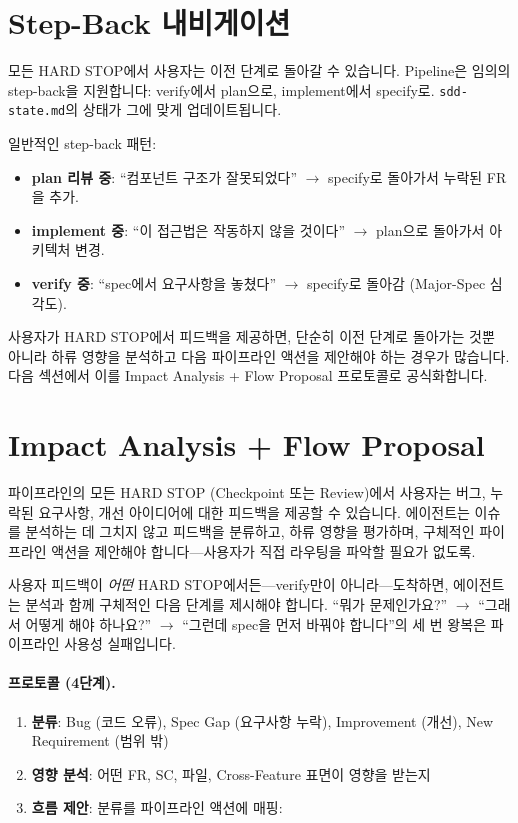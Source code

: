 \documentclass[11pt,a4paper,openright,twoside]{report}
\newcommand{\file}[1]{\texttt{#1}}
\begin{document}
\section{Step-Back 내비게이션}

모든 HARD STOP에서 사용자는 이전 단계로 돌아갈 수 있습니다. Pipeline은 임의의 step-back을 지원합니다: verify에서 plan으로, implement에서 specify로. \file{sdd-state.md}의 상태가 그에 맞게 업데이트됩니다.

일반적인 step-back 패턴:

\begin{itemize}
  \item \textbf{plan 리뷰 중}: ``컴포넌트 구조가 잘못되었다'' $\rightarrow$ specify로 돌아가서 누락된 FR을 추가.
  \item \textbf{implement 중}: ``이 접근법은 작동하지 않을 것이다'' $\rightarrow$ plan으로 돌아가서 아키텍처 변경.
  \item \textbf{verify 중}: ``spec에서 요구사항을 놓쳤다'' $\rightarrow$ specify로 돌아감 (Major-Spec 심각도).
\end{itemize}

사용자가 HARD STOP에서 피드백을 제공하면, 단순히 이전 단계로 돌아가는 것뿐 아니라 하류 영향을 분석하고 다음 파이프라인 액션을 제안해야 하는 경우가 많습니다. 다음 섹션에서 이를 Impact Analysis + Flow Proposal 프로토콜로 공식화합니다.

\section{Impact Analysis + Flow Proposal}

파이프라인의 모든 HARD STOP (Checkpoint 또는 Review)에서 사용자는 버그, 누락된 요구사항, 개선 아이디어에 대한 피드백을 제공할 수 있습니다. 에이전트는 이슈를 분석하는 데 그치지 않고 피드백을 분류하고, 하류 영향을 평가하며, 구체적인 파이프라인 액션을 제안해야 합니다---사용자가 직접 라우팅을 파악할 필요가 없도록.

사용자 피드백이 \emph{어떤} HARD STOP에서든---verify만이 아니라---도착하면, 에이전트는 분석과 함께 구체적인 다음 단계를 제시해야 합니다. ``뭐가 문제인가요?'' $\rightarrow$ ``그래서 어떻게 해야 하나요?'' $\rightarrow$ ``그런데 spec을 먼저 바꿔야 합니다''의 세 번 왕복은 파이프라인 사용성 실패입니다.

\paragraph{프로토콜 (4단계).}

\begin{enumerate}[nosep]
  \item \textbf{분류}: Bug (코드 오류), Spec Gap (요구사항 누락), Improvement (개선), New Requirement (범위 밖)
  \item \textbf{영향 분석}: 어떤 FR, SC, 파일, Cross-Feature 표면이 영향을 받는지
  \item \textbf{흐름 제안}: 분류를 파이프라인 액션에 매핑:
\end{enumerate}
\end{document}
